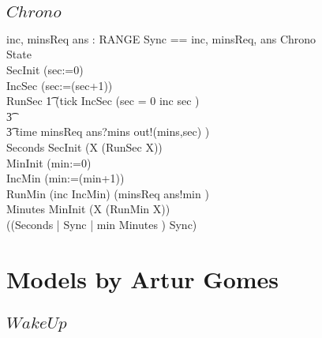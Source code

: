 \subsection{$Chrono$}
\begin{circus}
\circchannel inc, minsReq
\also \circchannel ans : RANGE
\also \circchannelset Sync == \lchanset inc, minsReq, ans \rchanset
\also \circprocess Chrono \circdef\ \circbegin\\
\circstate State \\
SecInit \circdef (sec:=0)\\
IncSec \circdef (sec:=(sec+1))\\
RunSec \circdef \t1
(tick \then IncSec \circseq
    (\circif  sec = 0 \circthen inc \then \Skip
    \circelse sec  \circthen \Skip \circfi)
  \\\t3 \extchoice\\
  \t3  time \then minsReq \then ans?mins \then out!(mins,sec)
      \then \Skip )  \\
Seconds \circdef SecInit \circseq (\circmu X \circspot (RunSec \circseq X))\\
MinInit \circdef (min:=0)\\
IncMin \circdef (min:=(min+1))\\
RunMin \circdef (inc \then IncMin) \extchoice (minsReq \then ans!min \then \Skip)\\
Minutes \circdef MinInit \circseq (\circmu X \circspot (RunMin \circseq X))\\
\circspot ((Seconds  | Sync | {min} \rpar Minutes ) \circhide Sync)\\
\circend
\end{circus}

\section{Models by Artur Gomes}

\subsection{$WakeUp$}

